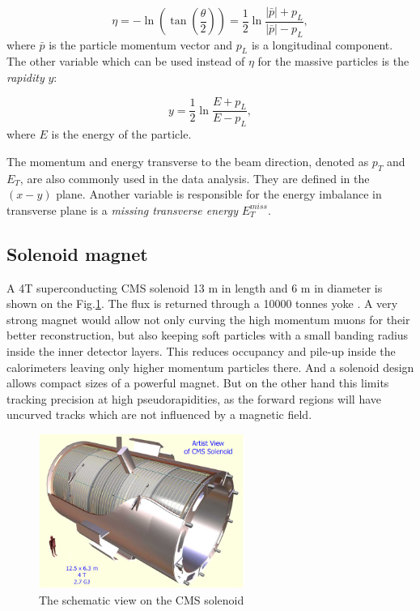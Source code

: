 \begin{equation}\label{eq:eta}
  \eta = -\ln(\tan(\frac{\theta}{2})) = \frac{1}{2}\ln\frac{|\bar{p}| + p_{L}}{|\bar{p}| - p_{L}},
\end{equation}
where $\bar{p}$ is the particle momentum vector and $p_{L}$ is a longitudinal component.
The other variable which can be used instead of $\eta$ for the massive particles is the \textit{rapidity} $y$:

\begin{equation}\label{eq:y}
  y = \frac{1}{2}\ln\frac{E + p_{L}}{E - p_{L}},
\end{equation} 
where $E$ is the energy of the particle.

The momentum and energy transverse to the beam direction, denoted as $p_{T}$ and $E_T$, are also commonly used in the data analysis. 
They are defined in the $(x-y)$ plane. Another variable is responsible for the energy imbalance in transverse plane is a
\textit{missing transverse energy} $E_{T}^{miss}$.

\subsection{Solenoid magnet}\label{ssec:solenoid}

A 4T superconducting CMS solenoid 13 m in length and 6 m in diameter is shown on the Fig.\ref{fig:solenoid}. 
The flux is returned through a 10000 tonnes yoke \cite{CMSatLHC}. A very strong magnet would allow not only curving
the high momentum muons for their better reconstruction, but also keeping soft particles with a small banding radius
inside the inner detector layers. This reduces occupancy and pile-up inside the calorimeters leaving only higher
momentum particles there. And a solenoid design allows compact sizes of a powerful magnet.
But on the other hand this limits tracking precision at high pseudorapidities, as the forward regions will have 
uncurved tracks which are not influenced by a magnetic field\cite{Dissertori:2010xe}.


\begin{figure}[t]
  \centering
  \includegraphics[width=0.6\textwidth]{02_experimental_setup/plots/CERN_CMS_Solenoid_schematic.jpg}
  \caption{The schematic view on the CMS solenoid}
  \label{fig:solenoid}
\end{figure}


